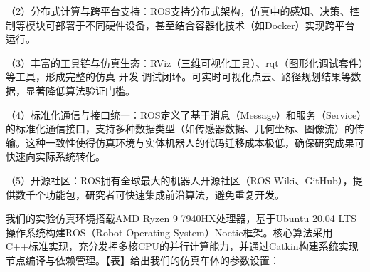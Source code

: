 \documentclass[master,academic]{ysuthesis} %
\begin{document}
	（2）分布式计算与跨平台支持：ROS支持分布式架构，仿真中的感知、决策、控制等模块可部署于不同硬件设备，甚至结合容器化技术（如Docker）实现跨平台运行。

	（3）丰富的工具链与仿真生态​：RViz（三维可视化工具）、rqt（图形化调试套件）等工具，形成完整的仿真-开发-调试闭环。可实时可视化点云、路径规划结果等数据，显著降低算法验证门槛。

	（4）标准化通信与接口统一：ROS定义了基于消息（Message）和服务（Service）的标准化通信接口，支持多种数据类型（如传感器数据、几何坐标、图像流）的传输。这种一致性使得仿真环境与实体机器人的代码迁移成本极低，确保研究成果可快速向实际系统转化。

	（5）开源社区：ROS拥有全球最大的机器人开源社区（ROS Wiki、GitHub），提供数千个功能包，研究者可快速集成前沿算法，避免重复开发。

	我们的实验仿真环境搭载AMD Ryzen 9 7940HX处理器，基于Ubuntu 20.04 LTS操作系统构建ROS（Robot Operating System）Noetic框架。核心算法采用C++标准实现，充分发挥多核CPU的并行计算能力，并通过Catkin构建系统实现节点编译与依赖管理。【表】给出我们的仿真车体的参数设置：
\end{document}
